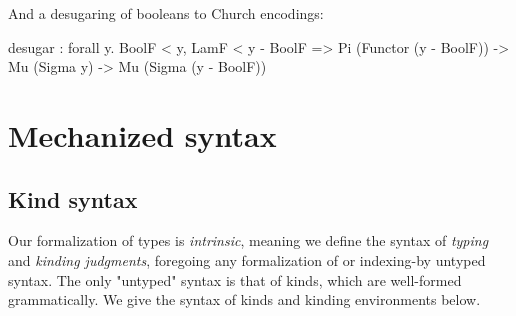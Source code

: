 \documentclass[authoryear, acmsmall, screen, review, nonacm]{acmart} %
\begin{document}
\Ni And a desugaring of booleans to Church encodings:

\begin{rosi}
desugar : forall y. BoolF < y, LamF < y - BoolF =>
          Pi (Functor (y - BoolF)) -> Mu (Sigma y) -> Mu (Sigma (y - BoolF))
\end{rosi}

\section{Mechanized syntax}

\subsection{Kind syntax}

Our formalization of \Rome types is \emph{intrinsic}, meaning we define the syntax of \emph{typing} and \emph{kinding judgments}, foregoing any formalization of or indexing-by untyped syntax. The only "untyped" syntax is that of kinds, which are well-formed grammatically. We give the syntax of kinds and kinding environments below.
\end{document}
